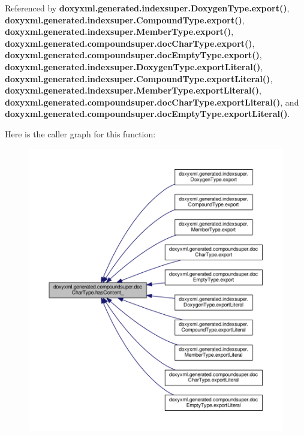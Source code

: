 Referenced by {\bf doxyxml.\+generated.\+indexsuper.\+Doxygen\+Type.\+export()}, {\bf doxyxml.\+generated.\+indexsuper.\+Compound\+Type.\+export()}, {\bf doxyxml.\+generated.\+indexsuper.\+Member\+Type.\+export()}, {\bf doxyxml.\+generated.\+compoundsuper.\+doc\+Char\+Type.\+export()}, {\bf doxyxml.\+generated.\+compoundsuper.\+doc\+Empty\+Type.\+export()}, {\bf doxyxml.\+generated.\+indexsuper.\+Doxygen\+Type.\+export\+Literal()}, {\bf doxyxml.\+generated.\+indexsuper.\+Compound\+Type.\+export\+Literal()}, {\bf doxyxml.\+generated.\+indexsuper.\+Member\+Type.\+export\+Literal()}, {\bf doxyxml.\+generated.\+compoundsuper.\+doc\+Char\+Type.\+export\+Literal()}, and {\bf doxyxml.\+generated.\+compoundsuper.\+doc\+Empty\+Type.\+export\+Literal()}.



Here is the caller graph for this function\+:
\nopagebreak
\begin{figure}[H]
\begin{center}
\leavevmode
\includegraphics[width=350pt]{d3/dba/classdoxyxml_1_1generated_1_1compoundsuper_1_1docCharType_a798b8ccb1ee2db88795a3fb6e518c25e_icgraph}
\end{center}
\end{figure}



